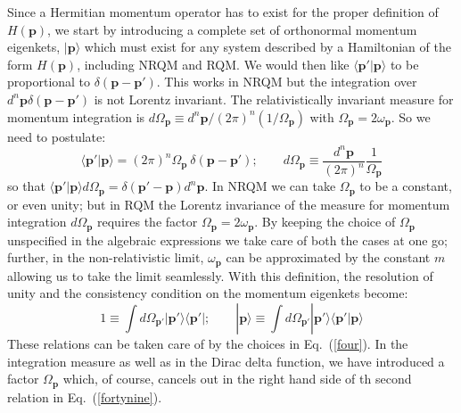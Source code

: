\documentclass{article}
\def\eq#1{{Eq.~(\ref{#1})}}
\def\ket#1{|#1\rangle}                    %
\def\bra#1{\langle #1|}                   %
\def\amp#1#2{\langle #1 | #2\rangle}      %
\begin{document}
 Since a Hermitian momentum operator has  to exist for the proper definition of $ H(\bm{p})$, we start by introducing a complete set of orthonormal momentum eigenkets, $\ket{\bm{p}}$ which must exist for any system described by a Hamiltonian of the form $ H(\bm{p})$, including NRQM and RQM. We would then like $\amp{\bm{p}'}{\bm{p}}$ to be proportional to $\delta (\bm{p}- \bm{p}')$. This works in NRQM but the integration over $d^n\bm{p}\delta (\bm{p}- \bm{p}')$ is not Lorentz invariant. The relativistically invariant measure for momentum integration is $d\Omega_{\bm{p}} \equiv d^n \bm{p}/(2\pi)^n (1/\Omega_{\bm{p}})$ with $\Omega_{\bm{p}} = 2\omega_{\bm{p}}$. So we need to  postulate:
 \begin{equation}
 \amp{\bm{p}'}{\bm{p}} = (2\pi)^n \Omega_{\bm{p}}\ \delta (\bm{p}- \bm{p}'); \qquad d\Omega_{\bm{p}} \equiv \frac{d^n \bm{p}}{(2\pi)^n} \frac{1}{\Omega_{\bm{p}}}
 \label{four}
\end{equation} 
so that $\amp{\bm{p}'}{\bm{p}} d\Omega_{\bm{p}} = \delta (\bm{p}'- \bm{p}) d^n \bm{p}$.
 In NRQM we can take $\Omega_{\bm{p}}$ to be a constant, or even unity; but in RQM the Lorentz invariance of the measure for momentum integration $d\Omega_{\bm{p}}$ requires the factor
 $\Omega_{\bm{p}} = 2\omega_{\bm{p}}$. By keeping the choice of $\Omega_{\bm{p}}$ unspecified in the algebraic expressions we take care of both the cases at one go; further, in the non-relativistic limit, $\omega_{\bm{p}}$ can be approximated by the constant $m$ allowing us to take the limit seamlessly. 
 With this definition, the resolution of unity and the consistency condition on the momentum eigenkets become:
 \begin{equation}
1 \equiv \int d\Omega_{\bm{p}'} \ket{\bm{p}'}\bra{\bm{p}'};\qquad 
\ket{ \bm{p}} \equiv \int d\Omega_{\bm{p}'} \ket{\bm{p}'}\amp{\bm{p}'}{\bm{p}}
\label{fortynine}
\end{equation} 
 These relations can be taken care of by the choices in \eq{four}.
 In the integration measure as well as in the Dirac delta function, we have introduced a factor $\Omega_{\bm{p}}$ which, of course, cancels out in the right hand side of th second relation in \eq{fortynine}. 
 
\end{document}
